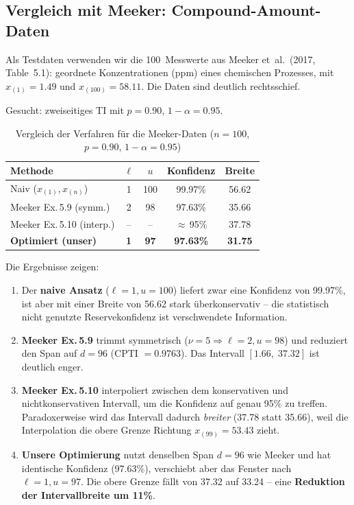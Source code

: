 \documentclass[10pt,a4paper,twocolumn]{article}
\theoremstyle{definition}
\begin{document}
\subsection{Vergleich mit Meeker: Compound-Amount-Daten}
\label{sec:vergleich_meeker}

Als Testdaten verwenden wir die 100~Messwerte aus Meeker et~al.\
(2017, Table~5.1): geordnete Konzentrationen (ppm) eines chemischen
Prozesses, mit $x_{(1)} = 1.49$ und $x_{(100)} = 58.11$.
Die Daten sind deutlich rechtsschief.

Gesucht: zweiseitiges TI mit $p = 0.90$, $1-\alpha = 0.95$.

\begin{table}[H]
\centering
\caption{Vergleich der Verfahren für die Meeker-Daten ($n=100$, $p=0.90$, $1-\alpha = 0.95$)}
\label{tab:meeker_vergleich}
\small
\begin{tabular}{@{}lcccc@{}}
\toprule
Methode & $\ell$ & $u$ & Konfidenz & Breite \\
\midrule
Naiv ($x_{(1)}, x_{(n)}$) & 1 & 100 & 99.97\% & 56.62 \\
Meeker Ex.\,5.9 (symm.) & 2 & 98 & 97.63\% & 35.66 \\
Meeker Ex.\,5.10 (interp.) & -- & -- & $\approx$\,95\% & 37.78 \\
\textbf{Optimiert (unser)} & \textbf{1} & \textbf{97} & \textbf{97.63\%} & \textbf{31.75} \\
\bottomrule
\end{tabular}
\end{table}

Die Ergebnisse zeigen:

\begin{enumerate}[leftmargin=*]
    \item Der \textbf{naive Ansatz} ($\ell=1, u=100$) liefert zwar eine
    Konfidenz von 99.97\%, ist aber mit einer Breite von 56.62 stark
    überkonservativ -- die statistisch nicht genutzte Reservekonfidenz
    ist verschwendete Information.

    \item \textbf{Meeker Ex.\,5.9} trimmt symmetrisch ($\nu = 5 \Rightarrow \ell=2, u=98$)
    und reduziert den Span auf $d = 96$ (CPTI $= 0.9763$). Das Intervall
    $[1.66,\; 37.32]$ ist deutlich enger.

    \item \textbf{Meeker Ex.\,5.10} interpoliert zwischen dem konservativen
    und nichtkonservativen Intervall, um die Konfidenz auf genau 95\% zu
    treffen. Paradoxerweise wird das Intervall dadurch \emph{breiter}
    (37.78 statt 35.66), weil die Interpolation die obere Grenze
    Richtung $x_{(99)} = 53.43$ zieht.

    \item \textbf{Unsere Optimierung} nutzt denselben Span $d = 96$ wie
    Meeker und hat identische Konfidenz (97.63\%), verschiebt aber das
    Fenster nach $\ell = 1, u = 97$. Die obere Grenze fällt von 37.32
    auf 33.24 -- eine \textbf{Reduktion der Intervallbreite um 11\%}.
\end{enumerate}
\end{document}
